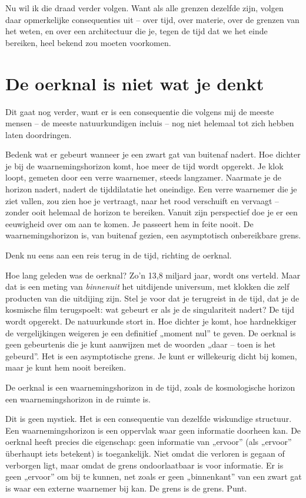 \documentclass[11pt, twoside, openright]{book}
\begin{document}
Nu wil ik die draad verder volgen. Want als alle grenzen dezelfde zijn, volgen daar opmerkelijke consequenties uit -- over tijd, over materie, over de grenzen van het weten, en over een architectuur die je, tegen de tijd dat we het einde bereiken, heel bekend zou moeten voorkomen.


\section*{De oerknal is niet wat je denkt}

Dit gaat nog verder, want er is een consequentie die volgens mij de meeste mensen -- de meeste natuurkundigen incluis -- nog niet helemaal tot zich hebben laten doordringen.

Bedenk wat er gebeurt wanneer je een zwart gat van buitenaf nadert. Hoe dichter je bij de waarnemingshorizon komt, hoe meer de tijd wordt opgerekt. Je klok loopt, gemeten door een verre waarnemer, steeds langzamer. Naarmate je de horizon nadert, nadert de tijddilatatie het oneindige. Een verre waarnemer die je ziet vallen, zou zien hoe je vertraagt, naar het rood verschuift en vervaagt -- zonder ooit helemaal de horizon te bereiken. Vanuit zijn perspectief doe je er een eeuwigheid over om aan te komen. Je passeert hem in feite nooit. De waarnemingshorizon is, van buitenaf gezien, een asymptotisch onbereikbare grens.

Denk nu eens aan een reis terug in de tijd, richting de oerknal.

Hoe lang geleden was de oerknal? Zo'n 13,8 miljard jaar, wordt ons verteld. Maar dat is een meting van \textit{binnenuit} het uitdijende universum, met klokken die zelf producten van die uitdijing zijn. Stel je voor dat je terugreist in de tijd, dat je de kosmische film terugspoelt: wat gebeurt er als je de singulariteit nadert? De tijd wordt opgerekt. De natuurkunde stort in. Hoe dichter je komt, hoe hardnekkiger de vergelijkingen weigeren je een definitief „moment nul” te geven. De oerknal is geen gebeurtenis die je kunt aanwijzen met de woorden „daar -- toen is het gebeurd”. Het is een asymptotische grens. Je kunt er willekeurig dicht bij komen, maar je kunt hem nooit bereiken.

De oerknal is een waarnemingshorizon in de tijd, zoals de kosmologische horizon een waarnemingshorizon in de ruimte is.

Dit is geen mystiek. Het is een consequentie van dezelfde wiskundige structuur. Een waarnemingshorizon is een oppervlak waar geen informatie doorheen kan. De oerknal heeft precies die eigenschap: geen informatie van „ervoor” (als „ervoor” überhaupt iets betekent) is toegankelijk. Niet omdat die verloren is gegaan of verborgen ligt, maar omdat de grens ondoorlaatbaar is voor informatie. Er is geen „ervoor” om bij te kunnen, net zoals er geen „binnenkant” van een zwart gat is waar een externe waarnemer bij kan. De grens is de grens. Punt.
\end{document}
